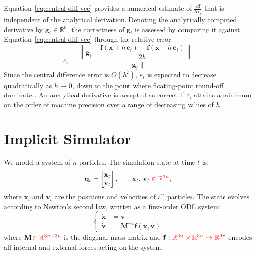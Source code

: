 \documentclass{article}
\newcommand{\pdc}[2]{\frac{\partial #1}{\partial #2}}
\newcommand{\red}[1]{\textcolor{red}{#1}}
\begin{document}
Equation~\eqref{eq:central-diff-vec} provides a numerical estimate of $\pdc{\mathbf{f}}{\mathbf{x}_i}$ that is independent of the analytical derivation. Denoting the analytically computed derivative by $\mathbf{g}_i \in \mathbb{R}^n$, the correctness of $\mathbf{g}_i$ is assessed by comparing it against Equation~\eqref{eq:central-diff-vec} through the relative error
\begin{equation}
\varepsilon_i = \frac{\left\lVert \mathbf{g}_i -
  \dfrac{\mathbf{f}(\mathbf{x} + h\,\mathbf{e}_i) - \mathbf{f}(\mathbf{x} - h\,\mathbf{e}_i)}{2h}
  \right\rVert}{\lVert \mathbf{g}_i \rVert}
\end{equation}
Since the central difference error is $O(h^2)$, $\varepsilon_i$ is expected to decrease quadratically as $h \to 0$, down to the point where floating-point round-off dominates. An analytical derivative is accepted as correct if $\varepsilon_i$ attains a minimum on the order of machine precision over a range of decreasing values of $h$.

\newpage

\section{Implicit Simulator}
\label{sec:implict_sim}
We model a system of $n$ particles. The simulation state at time $t$ is:
\begin{equation*}
    \mathbf{q}_t = \begin{bmatrix}\mathbf{x}_t \\ \mathbf{v}_t\end{bmatrix}, 
    \qquad \mathbf{x}_t,\, \mathbf{v}_t\; \red{\in \mathbb{R}^{3n}},
\end{equation*}
where $\mathbf{x}_t$ and $\mathbf{v}_t$ are the positions and velocities of all particles.
The state evolves according to Newton's second law, written as a first-order ODE system:
\begin{equation}
\label{eq:motion_ODE}
    \left\{
    \begin{aligned}
        \dot{\mathbf{x}} &= \mathbf{v} \\
        \dot{\mathbf{v}} &= \mathbf{M}^{-1}\mathbf{f}(\mathbf{x}, \mathbf{v})
    \end{aligned}
    \right.
\end{equation}
where $\mathbf{M}\, \red{\in \mathbb{R}^{3n \times 3n}}$ is the diagonal mass matrix and $\mathbf{f}: \red{\mathbb{R}^{3n} \times \mathbb{R}^{3n} \rightarrow \mathbb{R}^{3n}}$ encodes all internal and external forces acting on the system.
\end{document}
